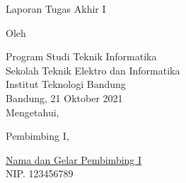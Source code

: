 \clearpage
\pagestyle{empty}

\begin{center}
    \smallskip
    
    \Large \bfseries \MakeUppercase{\thetitle}
    \vfill
    
    \Large Laporan Tugas Akhir I
    \vfill
    
    \large Oleh
    
    \Large \theauthor
    
    \large Program Studi Teknik Informatika \\
    
    \normalsize \normalfont
    Sekolah Teknik Elektro dan Informatika \\
    Institut Teknologi Bandung \\
    
    \vfill
    \normalsize \normalfont
    Bandung, 21 Oktober 2021 \\
    Mengetahui,
    
    \vspace{0.5cm}
    Pembimbing I,
    
    \vfill
    \underline{Nama dan Gelar Pembimbing I} \\
    NIP. 123456789
    
\end{center}
\clearpage

